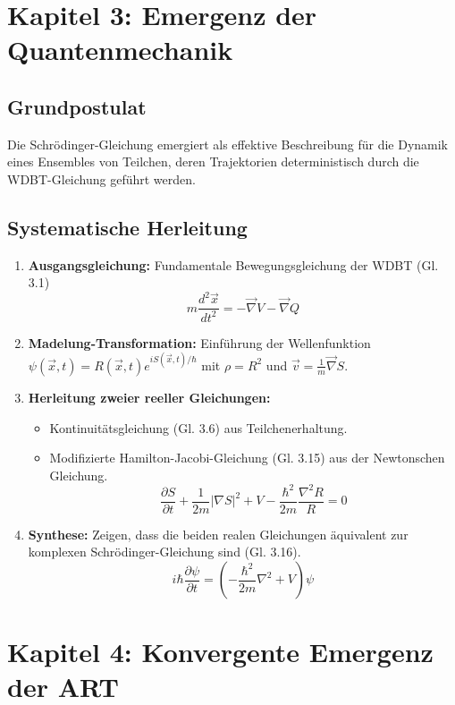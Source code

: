 \documentclass[10pt,a4paper]{article}
\begin{document}
\section{Kapitel 3: Emergenz der Quantenmechanik}

\subsection*{Grundpostulat}
Die Schrödinger-Gleichung emergiert als effektive Beschreibung für die Dynamik eines Ensembles von Teilchen, deren Trajektorien deterministisch durch die WDBT-Gleichung geführt werden.

\subsection*{Systematische Herleitung}
\begin{enumerate}
    \item \textbf{Ausgangsgleichung:} Fundamentale Bewegungsgleichung der WDBT (Gl. 3.1)
        \[
        m \frac{d^2 \vec{x}}{dt^2} = -\vec{\nabla}V - \vec{\nabla}Q
        \]
    \item \textbf{Madelung-Transformation:} Einführung der Wellenfunktion $\psi(\vec{x},t) = R(\vec{x},t)e^{iS(\vec{x},t)/\hbar}$ mit $\rho = R^2$ und $\vec{v} = \frac{1}{m}\vec{\nabla}S$.
    \item \textbf{Herleitung zweier reeller Gleichungen:}
        \begin{itemize}
            \item Kontinuitätsgleichung (Gl. 3.6) aus Teilchenerhaltung.
            \item Modifizierte Hamilton-Jacobi-Gleichung (Gl. 3.15) aus der Newtonschen Gleichung.
            \[
            \frac{\partial S}{\partial t} + \frac{1}{2m} |\nabla S|^2 + V - \frac{\hbar^2}{2m} \frac{\nabla^2 R}{R} = 0
            \]
        \end{itemize}
    \item \textbf{Synthese:} Zeigen, dass die beiden realen Gleichungen äquivalent zur komplexen Schrödinger-Gleichung sind (Gl. 3.16).
        \[
        i\hbar \frac{\partial \psi}{\partial t} = \left( -\frac{\hbar^2}{2m} \nabla^2 + V \right) \psi
        \]
\end{enumerate}

\section{Kapitel 4: Konvergente Emergenz der ART}
\end{document}
